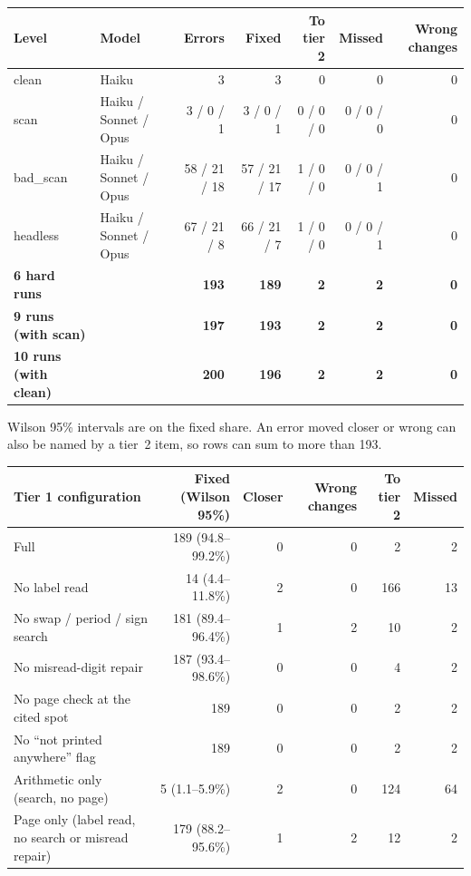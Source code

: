 \begin{center}
\begin{tabular}{llrrrrr}
\toprule
Level & Model & Errors & Fixed & To tier 2 & Missed & Wrong changes \\
\midrule
clean & Haiku & 3 & 3 & 0 & 0 & 0 \\
scan & Haiku / Sonnet / Opus & 3 / 0 / 1 & 3 / 0 / 1 & 0 / 0 / 0 & 0 / 0 / 0 & 0 \\
bad\_scan & Haiku / Sonnet / Opus & 58 / 21 / 18 & 57 / 21 / 17 & 1 / 0 / 0 & 0 / 0 / 1 & 0 \\
headless & Haiku / Sonnet / Opus & 67 / 21 / 8 & 66 / 21 / 7 & 1 / 0 / 0 & 0 / 0 / 1 & 0 \\
\midrule
\textbf{6 hard runs} & & \textbf{193} & \textbf{189} & \textbf{2} & \textbf{2} & \textbf{0} \\
\textbf{9 runs (with scan)} & & \textbf{197} & \textbf{193} & \textbf{2} & \textbf{2} & \textbf{0} \\
\textbf{10 runs (with clean)} & & \textbf{200} & \textbf{196} & \textbf{2} & \textbf{2} & \textbf{0} \\
\bottomrule
\end{tabular}
\end{center}

\label{tab:ablation}
Wilson 95\% intervals are on the fixed share. An error moved closer or wrong can also be named by a tier~2 item, so rows can sum to more than 193.
\begin{center}
\begin{tabular}{lrrrrr}
\toprule
Tier 1 configuration & Fixed (Wilson 95\%) & Closer & Wrong changes & To tier 2 & Missed \\
\midrule
Full & 189 (94.8--99.2\%) & 0 & 0 & 2 & 2 \\
No label read & 14 (4.4--11.8\%) & 2 & 0 & 166 & 13 \\
No swap / period / sign search & 181 (89.4--96.4\%) & 1 & 2 & 10 & 2 \\
No misread-digit repair & 187 (93.4--98.6\%) & 0 & 0 & 4 & 2 \\
No page check at the cited spot & 189 & 0 & 0 & 2 & 2 \\
No ``not printed anywhere'' flag & 189 & 0 & 0 & 2 & 2 \\
Arithmetic only (search, no page) & 5 (1.1--5.9\%) & 2 & 0 & 124 & 64 \\
Page only (label read, no search or misread repair) & 179 (88.2--95.6\%) & 1 & 2 & 12 & 2 \\
\bottomrule
\end{tabular}
\end{center}

